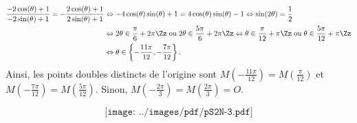 {{\begin{align*}\ensuremath
\frac{-2\cos(\theta)+1}{-2\sin(\theta)+1}=-\frac{2\cos(\theta)+1}{2\sin(\theta)+1}&\Leftrightarrow-4\cos(\theta)\sin(\theta)+1=4\cos(\theta
)\sin(\theta)-1\Leftrightarrow\sin(2\theta)=\frac{1}{2}\\
 &\Leftrightarrow2\theta\in\frac{\pi}{6}+2\pi\Zz\;\text{ou}\;2\theta\in\frac{5\pi}{6}+2\pi\Zz\Leftrightarrow\theta\in\frac{\pi}{12}+\pi\Zz\;\text{ou}\;\theta\in\frac{5\pi}{12}+\pi\Zz\\
 &\Leftrightarrow\theta\in\left\{-\frac{11\pi}{12},-\frac{7\pi}{12}\right\}.
\end{align*}
Ainsi, les points doubles distincts de l'origine sont $M\left(-\frac{11\pi}{12}\right)=M\left(\frac{\pi}{12}\right)$ et $M\left(-\frac{7\pi}{12}\right)=M\left(\frac{5\pi}{12}\right)$. Sinon, $M\left(-\frac{2\pi}{3}\right)=M\left(\frac{2\pi}{3}\right)=O$.

$$\texttt{[image: ../images/pdf/pS2N-3.pdf]}$$
}
}
